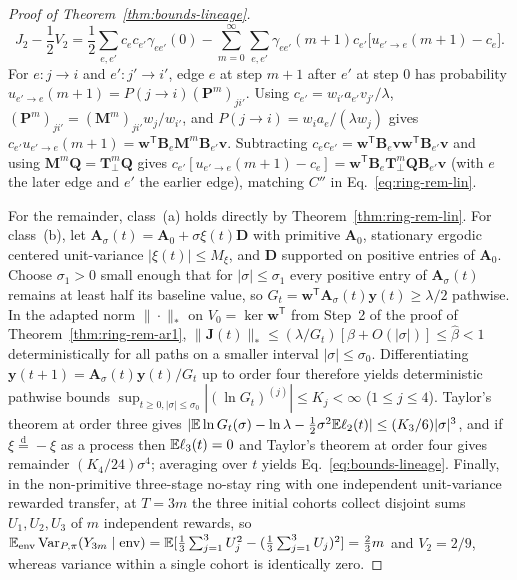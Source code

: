 \begin{proof}[Proof of Theorem~{\upshape\ref{thm:bounds-lineage}}]
\[
J_2 - \frac{1}{2}V_2 = \frac{1}{2}\sum_{e,e'} c_e c_{e'}\gamma_{ee'}(0) - \sum_{m=0}^{\infty}\sum_{e,e'} \gamma_{ee'}(m + 1) c_{e'}\bigl[u_{e' \to e}(m + 1) - c_e\bigr].
\]
For $e: j \to i$ and $e': j' \to i'$, edge $e$ at step $m + 1$ after $e'$ at step $0$ has probability $u_{e' \to e}(m + 1) = P(j \to i)(\mathbf{P}^m)_{j i'}$. Using $c_{e'} = w_{i'} a_{e'} v_{j'}/\lambda$, $(\mathbf{P}^m)_{j i'} = (\mathbf{M}^m)_{j i'} w_j / w_{i'}$, and $P(j \to i) = w_i a_e / (\lambda w_j)$ gives $c_{e'} u_{e' \to e}(m + 1) = \mathbf{w}^{\mathsf{T}}\mathbf{B}_e\mathbf{M}^m\mathbf{B}_{e'}\mathbf{v}$. Subtracting $c_e c_{e'} = \mathbf{w}^{\mathsf{T}}\mathbf{B}_e\mathbf{v}\mathbf{w}^{\mathsf{T}}\mathbf{B}_{e'}\mathbf{v}$ and using $\mathbf{M}^m\mathbf{Q} = \mathbf{T}_\perp^m\mathbf{Q}$ gives $c_{e'}[u_{e' \to e}(m + 1) - c_e] = \mathbf{w}^{\mathsf{T}}\mathbf{B}_e\mathbf{T}_\perp^m\mathbf{Q}\mathbf{B}_{e'}\mathbf{v}$ (with $e$ the later edge and $e'$ the earlier edge), matching $C''$ in Eq.~\eqref{eq:ring-rem-lin}.

For the remainder, class~(a) holds directly by Theorem~\ref{thm:ring-rem-lin}. For class~(b), let $\mathbf{A}_\sigma(t) = \mathbf{A}_0 + \sigma\xi(t)\mathbf{D}$ with primitive $\mathbf{A}_0$, stationary ergodic centered unit-variance $|\xi(t)| \le M_\xi$, and $\mathbf{D}$ supported on positive entries of $\mathbf{A}_0$. Choose $\sigma_1 > 0$ small enough that for $|\sigma| \le \sigma_1$ every positive entry of $\mathbf{A}_\sigma(t)$ remains at least half its baseline value, so $G_t = \mathbf{w}^{\mathsf{T}}\mathbf{A}_\sigma(t)\mathbf{y}(t) \ge \lambda/2$ pathwise. In the adapted norm $\|\cdot\|_*$ on $V_0 = \ker\mathbf{w}^{\mathsf{T}}$ from Step~2 of the proof of Theorem~\ref{thm:ring-rem-ar1}, $\|\mathbf{J}(t)\|_* \le (\lambda/G_t)[\beta + O(|\sigma|)] \le \hat{\beta} < 1$ deterministically for all paths on a smaller interval $|\sigma| \le \sigma_0$. Differentiating $\mathbf{y}(t + 1) = \mathbf{A}_\sigma(t)\mathbf{y}(t)/G_t$ up to order four therefore yields deterministic pathwise bounds $\sup_{t \ge 0, |\sigma| \le \sigma_0} |(\ln G_t)^{(j)}| \le K_j < \infty$ ($1 \le j \le 4$). Taylor's theorem at order three gives $|\mathbb{E}\ln G_t(\sigma) - \ln\lambda - \frac{1}{2}\sigma^2\mathbb{E}\ell_2(t)| \le (K_3/6)|\sigma|^3$, and if $\xi \stackrel{\mathrm{d}}{=} -\xi$ as a process then $\mathbb{E}\ell_3(t) = 0$ and Taylor's theorem at order four gives remainder $(K_4/24)\sigma^4$; averaging over $t$ yields Eq.~\eqref{eq:bounds-lineage}. Finally, in the non-primitive three-stage no-stay ring with one independent unit-variance rewarded transfer, at $T = 3m$ the three initial cohorts collect disjoint sums $U_1, U_2, U_3$ of $m$ independent rewards, so $\mathbb{E}_{\mathrm{env}}\operatorname{Var}_{P,\pi}(Y_{3m} \mid \text{env}) = \mathbb{E}[\frac{1}{3}\sum_{j=1}^3 U_j^2 - (\frac{1}{3}\sum_{j=1}^3 U_j)^2] = \frac{2}{3}m$ and $V_2 = 2/9$, whereas variance within a single cohort is identically zero.
\end{proof}
